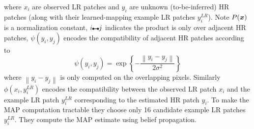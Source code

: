 where $x_i$ are observed LR patches and $y_i$ are unknown (to-be-inferred) HR patches (along with their learned-mapping example LR patches $y_i^{LR}$).
%
Note $P(\bm{x})$ is a normalization constant, $i\ue{} j$ indicates the product is only over adjacent HR patches, $\psi(y_i, y_j)$ encodes the compatibility of adjacent HR patches according to
\begin{equation}
    \psi(y_i, y_j) = \exp \left\{ -  \frac{\left\| y_i - y_j \right\|}{2\sigma^2} \right\}
\end{equation}
where $\left\| y_i - y_j \right\|$ is only computed on the overlapping pixels.
%
Similarly $\phi(x_i, y_i^{LR})$ encodes the compatibility between the observed LR patch $x_i$ and the example LR patch $y_i^{LR}$ corresponding to the estimated HR patch $y_i$.
%
To make the MAP computation tractable they choose only 16 candidate example LR patches $y_i^{LR}$.
%
They compute the MAP estimate using belief propagation.

